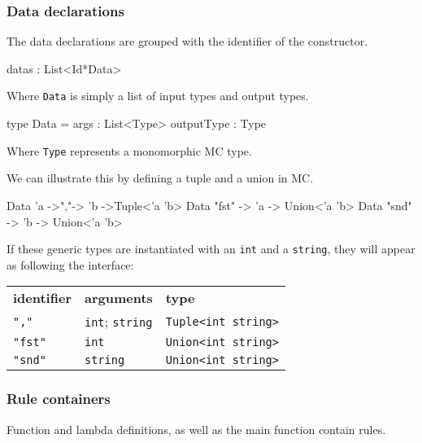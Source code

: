 \subsubsection{Data declarations}
The data declarations are grouped with the identifier of the constructor.

\begin{FS}
datas : List<Id*Data>
\end{FS}

Where \verb|Data| is simply a list of input types and output types.

\begin{FS}
type Data = {
  args       : List<Type>
  outputType : Type
}
\end{FS}

Where \verb|Type| represents a monomorphic MC type.


We can illustrate this by defining a tuple and a union in MC.

\begin{MC}
Data 'a ->","-> 'b ->Tuple<'a 'b>
Data "fst" -> 'a -> Union<'a 'b>
Data "snd" -> 'b -> Union<'a 'b>
\end{MC}

If these generic types are instantiated with an \verb|int| and a \verb|string|, they will appear as following the interface:

{\footnotesize
\begin{tabular}{lll}
    \textbf{\normalsize identifier} & \textbf{\normalsize arguments} & \textbf{\normalsize type}\\
    \verb:",":   & \verb:int:; \verb:string: & \verb:Tuple<int string>: \\
    \verb:"fst": & \verb:int:                & \verb:Union<int string>: \\
    \verb:"snd": & \verb:string:             & \verb:Union<int string>: \\
\end{tabular}
}


\subsubsection{Rule containers}

Function and lambda definitions, as well as the main function contain rules.

